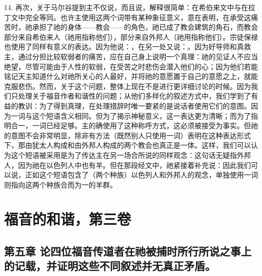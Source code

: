 14. 再次，关于马尔谷提到主不仅说，而且说，解释很简单：在希伯来文中与在拉丁文中完全等同。也许主使用这两个词带有某种象征意义，意在表明，在承受这痛苦时，祂承担了祂的身体——教会——的角色，祂已成了教会建筑的角石，而教会部分来自希伯来人（祂用指称他们），部分来自外邦人（祂用指称他们）。宗徒保禄也使用了同样有意义的表达。因为他说：，在另一处又说：。因为好导师和真救主，通过分担比较软弱者的痛苦，应在自己身上说明一个真理：祂的见证人不应当绝望，尽管可能由于人性的软弱，在受苦之时悲伤会潜入他们的心；因为他们若能铭记天主知道什么对祂所关心的人最好，并将祂的意愿置于自己的意愿之上，就能克服悲伤。然而，关于这个问题，整体上现在不是进行更详细讨论的时候。因为我们只处理关于福音作者和谐性的问题；从他们多样化的叙述方式中，我们学到了有益的教训：为了得到真理，在处理措辞时唯一要紧的是说话者使用它们的意图。因为一词与这个短语含义相同。但为了揭示神秘意义，这一表达更为清晰；而为了指明合一，一词已经足够。主的确使用了这种称呼方式，这必须被接受为事实。但祂的意图不会非常明显，除非有方法（既然别人只使用一词）表明在这种表达形式下，那由犹太人构成和由外邦人构成的两个教会也真正是一体。这样，我们可以认为这个短语被采用是为了传达主在另一场合所说的同样观念：这句话无疑指外邦人，因为祂在以色列人中也有羊。但在那段经文中，祂紧接着补充说：因此我们可以说，正如这个短语包含了（两个种族）以色列人和外邦人的观念，单独使用一词则指向这两个种族合而为一的羊群。\par



\section{福音的和谐，第三卷}


\subsection{第五章 论四位福音传道者在祂被捕时所行所说之事上的记载，并证明这些不同叙述并无真正矛盾。}


